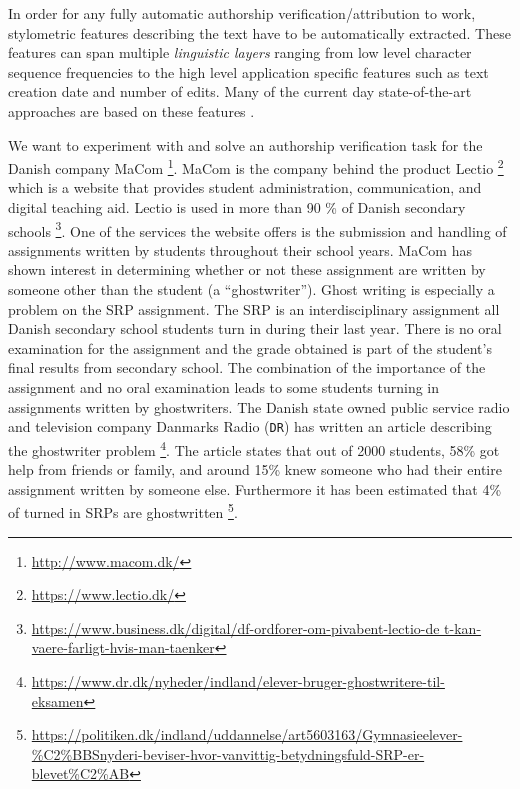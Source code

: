 In order for any fully automatic authorship verification/attribution to work,
stylometric features describing the text have to be automatically extracted.
These features can span multiple \textit{linguistic layers} ranging from low
level character sequence frequencies to the high level application specific
features such as text creation date and number of edits. Many of the current day
state-of-the-art approaches are based on these features \citep{stamatos2009}.


We want to experiment with and solve an authorship verification task for the
Danish company MaCom \footnote{\url{http://www.macom.dk/}}. MaCom is the company
behind the product Lectio \footnote{\url{https://www.lectio.dk/}} which is
a website that provides student administration, communication, and digital
teaching aid. Lectio is used in more than 90 \% of Danish secondary schools
\footnote{\url{https://www.business.dk/digital/df-ordforer-om-pivabent-lectio-de
t-kan-vaere-farligt-hvis-man-taenker}}. One of the services the website offers
is the submission and handling of assignments written by students throughout
their school years. MaCom has shown interest in determining whether or not these
assignment are written by someone other than the student (a ``ghostwriter'').
Ghost writing is especially a problem on the \gls{SRP} assignment. The \gls{SRP}
is an interdisciplinary assignment all Danish secondary school students turn in
during their last year. There is no oral examination for the assignment and the
grade obtained is part of the student's final results from secondary school.
The combination of the importance of the assignment and no oral examination
leads to some students turning in assignments written by ghostwriters. The
Danish state owned public service radio and television company Danmarks Radio
(\texttt{DR}) has written an article describing the ghostwriter problem
\footnote{\url{https://www.dr.dk/nyheder/indland/elever-bruger-ghostwritere-til-
eksamen}}. The article states that out of 2000 students, 58\% got
help from friends or family, and around 15\% knew someone who had
their entire assignment written by someone else. Furthermore it has
been estimated that 4\% of turned in \glspl{SRP} are ghostwritten
\footnote{\url{https://politiken.dk/indland/uddannelse/art5603163/Gymnasieelever-\%C2\%BBSnyderi-beviser-hvor-vanvittig-betydningsfuld-SRP-er-blevet\%C2\%AB}}.

